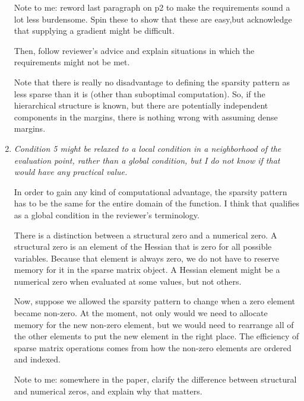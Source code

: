 \documentclass{article}
\newenvironment{revQuote}{\itshape}{\vspace{\baselineskip}}
\newenvironment{response}{\normalfont}{\vspace{\baselineskip}}
\begin{document}
\begin{enumerate}
\begin{revQuote}
  \end{revQuote}

\begin{response}

Note to me:  reword last paragraph on p2 to make the requirements
sound a lot less burdensome.  Spin these to show that these are
easy,but acknowledge that supplying a gradient might be difficult.

Then, follow reviewer's advice and explain situations in which the
requirements might not be met.

Note that there is really no disadvantage to defining the sparsity pattern as
less sparse than it is (other than suboptimal computation). So, if the
hierarchical structure is known, but there are potentially independent
components in the margins, there is nothing wrong with assuming dense margins.

\end{response}

\item \begin{revQuote}
Condition 5 might be relaxed to a local condition in a neighborhood of
the evaluation point, rather than a global condition, but I do not know if
that would have any practical value.
  \end{revQuote}

\begin{response}

  In order to gain any kind of computational advantage, the sparsity
  pattern has to be the same for the entire domain of the function. I
  think that qualifies as a global condition in the reviewer's
  terminology.

  There is a distinction between a structural zero and a numerical
  zero.  A structural zero is an element of the Hessian that is zero
  for all possible variables.  Because that element is always zero, we
  do not have to reserve memory for it in the sparse matrix object.
  A Hessian element might be a numerical zero when evaluated at some
  values, but not others.

  Now, suppose we allowed the sparsity pattern to change when a zero
  element became non-zero.  At the moment, not only would we need to
  allocate memory for the new non-zero element, but we would need to
  rearrange all of the other elements to put the new element in the
  right place.  The efficiency of sparse matrix operations comes from
  how the non-zero elements are ordered and indexed.

  
Note to me:  somewhere in the paper, clarify the difference between
structural and numerical zeros, and explain why that matters.
  

\end{response}
\end{enumerate}
\end{document}
